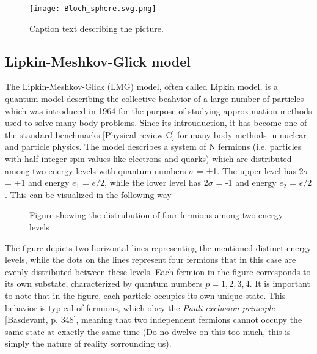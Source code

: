 \documentclass[onecolumn,10pt,cleanfoot]{asme2ej}
\begin{document}
\begin{enumerate}
\begin{figure}[ht]
  \centering
  \texttt{[image: Bloch\_sphere.svg.png]}
  \caption{Caption text describing the picture.}
  \label{fig:example}
\end{figure}

\end{enumerate}

\subsection{Lipkin-Meshkov-Glick model}
The Lipkin-Meshkov-Glick (LMG) model, often called Lipkin model, is a quantum model describing the collective beahvior of a large number of particles which was introduced in 1964 for the purpose of studying approximation methods used to solve many-body problems. Since its introuduction, it has become one of the standard benchmarks [Physical review C] for many-body methods in nuclear and particle physics. The model describes a system of N fermions (i.e. particles with half-integer spin values like electrons and quarks) which are distributed among two energy levels with quantum numbers $\sigma$ = ±1. The upper level has $2\sigma$ = +1 and energy $e_{1}$ = $e/2$, while the lower level has $2\sigma$ = -1 and energy $e_{2}$ = $e/2$. This can be visualized in the following way

\begin{figure}[H]
	\centering
	\caption{Figure showing the distrubution of four fermions among two energy levels}
\end{figure}

The figure depicts two horizontal lines representing the mentioned distinct energy levels, while the dots on the lines represent four fermions that in this case are evenly distributed between these levels. Each fermion in the figure corresponds to its own substate, characterized by quantum numbers $p = 1, 2, 3, 4$. It is important to note that in the figure, each particle occupies its own unique state. This behavior is typical of fermions, which obey the \textit{Pauli exclusion principle} [Basdevant, p. 348], meaning that two independent fermions cannot occupy the same state at exactly the same time (Do no dwelve on this too much, this is simply the nature of reality sorrounding us).
\end{document}
